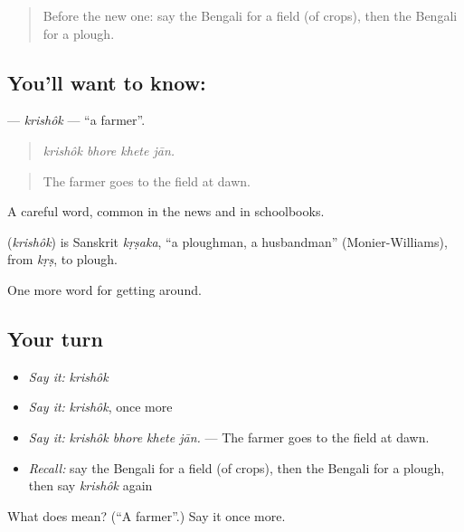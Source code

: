 \begin{quote}
Before the new one: say the Bengali for a field (of crops), then the Bengali for a plough.
\end{quote}

\subsection*{You'll want to know: }
\textbf{} — \emph{krishôk} — \textquotedblleft{}a farmer\textquotedblright{}.

\begin{quote}
   
\end{quote}

\begin{quote}
\emph{krishôk bhore khete jān.}
\end{quote}

\begin{quote}
The farmer goes to the field at dawn.
\end{quote}

A careful word, common in the news and in schoolbooks.

\begin{cousinweb}
\textbf{} (\emph{krishôk}) is Sanskrit \emph{kṛṣaka}, \textquotedblleft{}a ploughman, a husbandman\textquotedblright{} (Monier-Williams), from \emph{kṛṣ}, to plough.
\end{cousinweb}

\begin{grammarlens}[title={What you've built}]
One more word for getting around.
\end{grammarlens}

\subsection*{Your turn}
\begin{itemize}
\raggedright
  \item \emph{Say it:} \emph{krishôk}
  \item \emph{Say it:} \emph{krishôk}, once more
  \item \emph{Say it:} \emph{krishôk bhore khete jān.} — The farmer goes to the field at dawn.
  \item \emph{Recall:} say the Bengali for a field (of crops), then the Bengali for a plough, then say \emph{krishôk} again
\end{itemize}

\begin{tcolorbox}[breakable,colback=teal!4,colframe=teal!35!black,title={Before you move on}]
What does  mean? (\textquotedblleft{}A farmer\textquotedblright{}.) Say it once more.
\end{tcolorbox}
